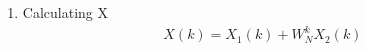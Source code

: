 \documentclass[journal,12pt,twocolumn]{IEEEtran}
\renewcommand\thesection{\arabic{section}}
\begin{document}
\begin{enumerate}[label=\thesection.\arabic*.,ref=\thesection.\theenumi]
\item Calculating X
\begin{align}
X(k) = X_{1}(k) + W^{k}_{N}X_{2}(k)
\end{align}

\end{enumerate}
\end{document}
